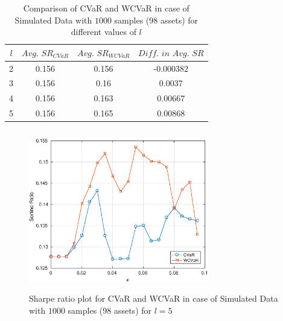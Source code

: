 \documentclass[12pt]{article}
\numberwithin{equation}{section}
\begin{document}
\begin{table}[!h]
    \centering
    \captionsetup{justification=centering}

   \begin{tabular}{||c|c|c|c||}
   \hline
  
$l$ & $Avg. \, \, SR_{CVaR}$ & $Avg. \, \, SR_{WCVaR}$ & $Diff. \, \, in \, \, Avg. \, \, SR$ \\
  
  \hline
2 & 0.156 & 0.156 & -0.000382 \\
3 & 0.156 & 0.16 & 0.0037 \\
4 & 0.156 & 0.163 & 0.00667 \\
5 & 0.156 & 0.165 & 0.00868 \\
  \hline
\end{tabular}
    \caption{Comparison of CVaR and WCVaR in case of Simulated Data with $1000$ samples (98 assets) for different values of $l$}
    \label{avgtab:6.6}
\end{table}

\begin{figure}[!h]
    \centering
   
    \includegraphics[height=7.0cm,width=0.7\textwidth]{CVaR/bse100_simulated/sr_1000_5.eps}

   \caption{Sharpe ratio plot for CVaR and WCVaR in case of Simulated Data with $1000$ samples (98 assets) for $l=5$}
   \label{fig:6.6}
\end{figure}
\end{document}
